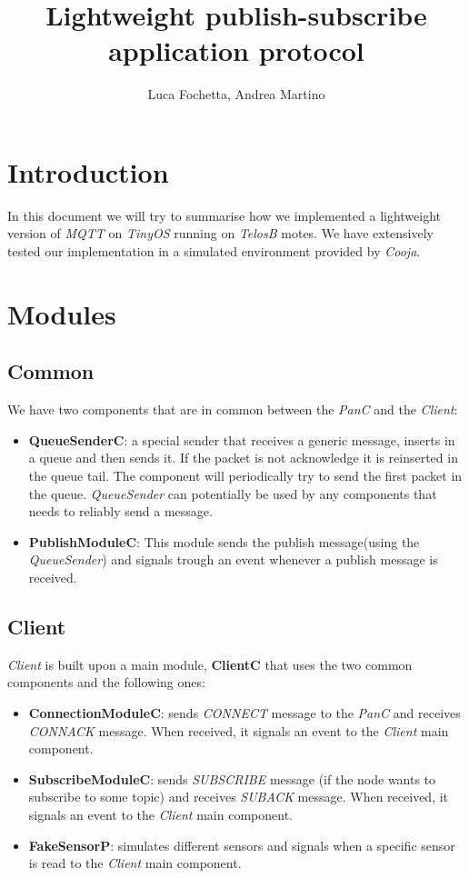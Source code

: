 \documentclass[10pt]{article}
\begin{document}
\title{Lightweight publish-subscribe application protocol}
\author{Luca Fochetta, Andrea Martino}

\maketitle


\section{Introduction}
In this document we will try to summarise how we implemented a lightweight version of \emph{MQTT} on \emph{TinyOS} running on \emph{TelosB} motes. We have extensively tested our implementation in a simulated environment provided by \emph{Cooja}.

\section{Modules}

\subsection{Common}
We have two components that are in common between the \emph{PanC} and the \emph{Client}:
\begin{itemize}
\item \textbf{QueueSenderC}: a special sender that receives a generic message, inserts in a queue and then sends it. If the packet is not acknowledge it is reinserted in the queue tail. The component will periodically try to send the first packet in the queue. \emph{QueueSender} can potentially be used by any components that needs to reliably send a message.
\item \textbf{PublishModuleC}: This module sends the publish message(using the \emph{QueueSender}) and signals trough an event whenever a publish message is received.
\end{itemize}

\subsection{Client}
\emph{Client} is built upon a main module, \textbf{ClientC} that uses the two common components and the following ones:
\begin{itemize}
\item \textbf{ConnectionModuleC}: sends \emph{CONNECT} message to the \emph{PanC} and receives \emph {CONNACK} message. When received, it signals an event to the \emph{Client} main component.
\item \textbf{SubscribeModuleC}: sends \emph{SUBSCRIBE} message (if the node wants to subscribe to some topic) and receives \emph{SUBACK} message. When received, it signals an event to the \emph{Client} main component.
\item \textbf{FakeSensorP}: simulates different sensors and signals when a specific sensor is read to the \emph{Client} main component.
\end{itemize}
\end{document}
